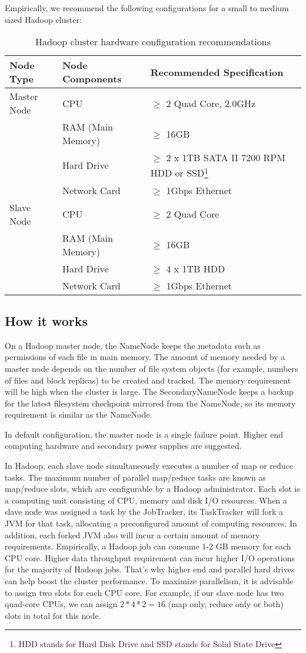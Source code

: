 Empirically, we recommend the following configurations for a small to medium sized Hadoop cluster:

\begin{table}[h]
  \centering
  \begin{tabular}{lll}
    \toprule
    \textbf{Node Type} & \textbf{Node Components} & \textbf{Recommended Specification} \\ \midrule
    Master Node & CPU	& $\ge$ 2 Quad Core, 2.0GHz \\ 
    & RAM (Main Memory) & $\ge$ 16GB \\
    & Hard Drive & $\ge$ 2 x 1TB SATA II 7200 RPM HDD or SSD\footnote{HDD stands for Hard Disk Drive and SSD stands for Solid State Drive} \\
    & Network Card & $\ge$ 1Gbps Ethernet \\ \midrule
    Slave Node & CPU & $\ge$ 2 Quad Core \\ 
    & RAM (Main Memory) & $\ge$ 16GB \\
    & Hard Drive & $\ge$ 4 x 1TB HDD \\
    & Network Card & $\ge$ 1Gbps Ethernet \\ \bottomrule
  \end{tabular}
  \caption{Hadoop cluster hardware configuration recommendations}\label{tbl:cluster.hardware}
\end{table}
\subsection*{How it works}
On a Hadoop master node, the NameNode keeps the metadata such as permissions of each file in main memory. The amount of memory needed by a master node depends on the number of file system objects (for example, numbers of files and block replicas) to be created and tracked. The memory requirement will be high when the cluster is large. The SecondaryNameNode keeps a backup for the latest filesystem checkpoint mirrored from the NameNode, so its memory requirement is similar as the NameNode.

In default configuration, the master node is a single failure point. Higher end computing hardware and secondary power supplies are suggested.

In Hadoop, each slave node simultaneously executes a number of map or reduce tasks. The maximum number of parallel map/reduce tasks are known as map/reduce slots, which are configurable by a Hadoop administrator. Each slot is a computing unit consisting of CPU, memory and disk I/O resources. When a slave node was assigned a task by the JobTracker, its TaskTracker will fork a JVM for that task, allocating a preconfigured amount of computing resources. In addition, each forked JVM also will incur a certain amount of memory requirements. Empirically, a Hadoop job can consume 1-2 GB memory for each CPU core. Higher data throughput requirement can incur higher I/O operations for the majority of Hadoop jobs. That's why higher end and parallel hard drives can help boost the cluster performance. To maximize parallelism, it is advisable to assign two slots for each CPU core. For example, if our slave node has two quad-core CPUs, we can assign $2 * 4 * 2 = 16$ (map only, reduce only or both) slots in total for this node.

